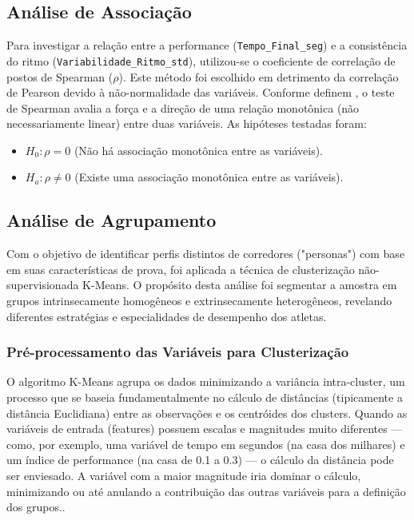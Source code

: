 \subsection{Análise de Associação}
Para investigar a relação entre a performance (\texttt{Tempo\_Final\_seg}) e a consistência do ritmo (\texttt{Variabilidade\_Ritmo\_std}), utilizou-se o coeficiente de correlação de postos de Spearman ($\rho$). Este método foi escolhido em detrimento da correlação de Pearson devido à não-normalidade das variáveis. Conforme definem \citet{siegel1988}, o teste de Spearman avalia a força e a direção de uma relação monotônica (não necessariamente linear) entre duas variáveis. As hipóteses testadas foram:
\begin{itemize}
    \item $H_0: \rho = 0$ (Não há associação monotônica entre as variáveis).
    \item $H_a: \rho \neq 0$ (Existe uma associação monotônica entre as variáveis).
\end{itemize}

\subsection{Análise de Agrupamento}

Com o objetivo de identificar perfis distintos de corredores ("personas") com base em suas características de prova, foi aplicada a técnica de clusterização não-supervisionada K-Means. O propósito desta análise foi segmentar a amostra em grupos intrinsecamente homogêneos e extrinsecamente heterogêneos, revelando diferentes estratégias e especialidades de desempenho dos atletas.

\subsubsection{Pré-processamento das Variáveis para Clusterização}

O algoritmo K-Means agrupa os dados minimizando a variância intra-cluster, um processo que se baseia fundamentalmente no cálculo de distâncias (tipicamente a distância Euclidiana) entre as observações e os centróides dos clusters. Quando as variáveis de entrada (features) possuem escalas e magnitudes muito diferentes — como, por exemplo, uma variável de tempo em segundos (na casa dos milhares) e um índice de performance (na casa de 0.1 a 0.3) — o cálculo da distância pode ser enviesado. A variável com a maior magnitude iria dominar o cálculo, minimizando ou até anulando a contribuição das outras variáveis para a definição dos grupos.\citep{muller2016}.


